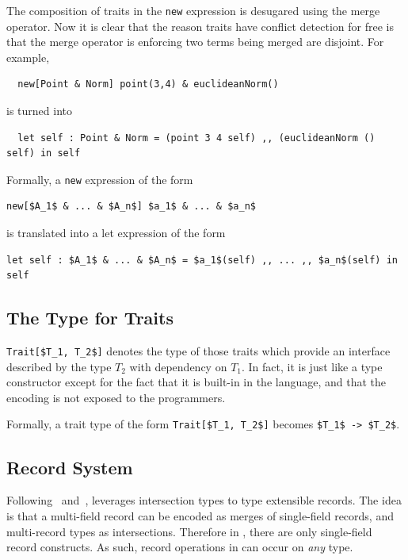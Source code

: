 The composition of traits in the \lstinline{new} expression is desugared using
the merge operator. Now it is clear that the reason traits have conflict
detection for free is that the merge operator is enforcing two terms being
merged are disjoint. For example,
\begin{lstlisting}
  new[Point & Norm] point(3,4) & euclideanNorm()
\end{lstlisting}
is turned into
\begin{lstlisting}
  let self : Point & Norm = (point 3 4 self) ,, (euclideanNorm () self) in self
\end{lstlisting}

Formally, a \lstinline{new} expression of the form
\begin{lstlisting}[mathescape=true]
  new[$A_1$ & ... & $A_n$] $a_1$ & ... & $a_n$
\end{lstlisting}
is translated into a let expression of the form
\begin{lstlisting}[mathescape=true]
  let self : $A_1$ & ... & $A_n$ = $a_1$(self) ,, ... ,, $a_n$(self) in self
\end{lstlisting}

\subsection{The Type for Traits}

\lstinline[mathescape=true]{Trait[$T_1, T_2$]} denotes the type of those traits
which provide an interface described by the type $T_2$ with dependency on $T_1$.
In fact, it is just like a type constructor except for the fact that it is
built-in in the language, and that the encoding is not exposed to the
programmers.

Formally, a trait type of the form \lstinline[mathescape=true]{Trait[$T_1, T_2$]} becomes \lstinline[mathescape=true]{$T_1$ -> $T_2$}.

\subsection{Record System}

Following~\citet{reynolds1997design} and~\citet{castagna1995calculus}, \name
leverages intersection types to type extensible records. The idea is that a
multi-field record can be encoded as merges of single-field records, and
multi-record types as intersections. Therefore in \name, there are only
single-field record constructs. As such, record operations in \name can occur on
\textit{any} type.

